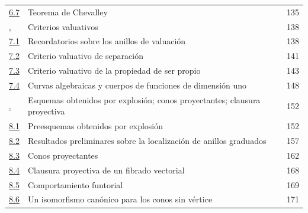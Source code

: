 \documentclass[oneside,10pt]{amsart}
\newcommand{\oldpage}[2][]{\marginnote{\normalfont\footnotesize\textbf{#1}~|~#2}\ignorespaces}
\begin{document}
\begin{longtable}{@{}p{}p{}r@{}}
\hyperref[subsection:II.6.7-fr]{6.7} & Teorema de Chevalley & 135\\
\hyperref[section:II.7-fr]{\textsection7.} & Criterios valuativos & 138\\
\hyperref[subsection:II.7.1-fr]{7.1} & Recordatorios sobre los anillos de valuación & 138\\
\hyperref[subsection:II.7.2-fr]{7.2} & Criterio valuativo de separación & 141\\
\hyperref[subsection:II.7.3-fr]{7.3} & Criterio valuativo de la propiedad de ser propio & 143\\
\hyperref[subsection:II.7.4-fr]{7.4} & Curvas algebraicas y cuerpos de funciones de dimensión uno & 148\\
\hyperref[section:II.8-fr]{\textsection8.} & Esquemas obtenidos por explosión; conos proyectantes; clausura proyectiva & 152\\
\hyperref[subsection:II.8.1-fr]{8.1} & Preesquemas obtenidos por explosión & 152\\
\hyperref[subsection:II.8.2-fr]{8.2} & Resultados preliminares sobre la localización de anillos graduados & 157\\
\hyperref[subsection:II.8.3-fr]{8.3} & Conos proyectantes & 162\\
\hyperref[subsection:II.8.4-fr]{8.4} & Clausura proyectiva de un fibrado vectorial & 168\\
\hyperref[subsection:II.8.5-fr]{8.5} & Comportamiento funtorial & 169\\
\hyperref[subsection:II.8.6-fr]{8.6} & Un isomorfismo canónico para los conos sin vértice & 171\\
\end{longtable}
\oldpage[II]{215}
\end{document}
